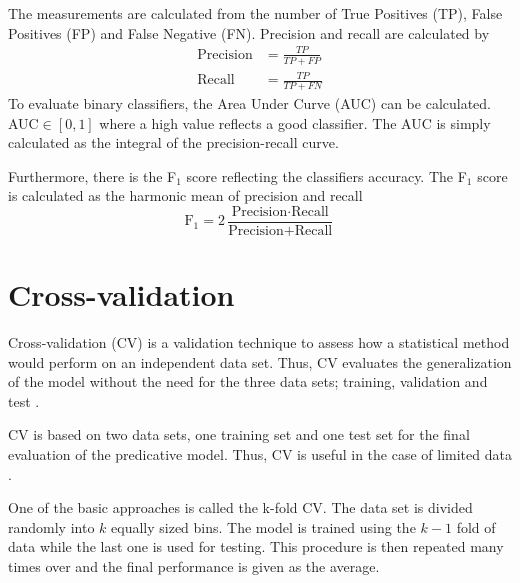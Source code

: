 The measurements are calculated from the number of True Positives (TP), False Positives (FP) and False Negative (FN). Precision and recall are calculated by \citep{powers2011}
\begin{align}
\text{Precision}&=\frac{TP}{TP+FP}\\
\text{Recall}&=\frac{TP}{TP+FN}
\end{align}
To evaluate binary classifiers, the Area Under Curve (AUC) can be calculated. AUC$\in[0,1]$ where a high value reflects a good classifier. The AUC is simply calculated as the integral of the precision-recall curve.

Furthermore, there is the F$_1$ score reflecting the classifiers accuracy. The F$_1$ score is calculated as the harmonic mean of precision and recall \citep{powers2011}
\begin{equation}
    \text{F}_1 = 2\frac{\text{Precision}\cdot \text{Recall}}{\text{Precision}+\text{Recall}}
\end{equation}

\section{Cross-validation}
Cross-validation (CV) is a validation technique to assess how a statistical method would perform on an independent data set. Thus, CV evaluates the generalization of the model without the need for the three data sets; training, validation and test \citep{Krstajic2014}.

CV is based on two data sets, one training set and one test set for the final evaluation of the predicative model. Thus, CV is useful in the case of limited data \citep{Krstajic2014}. 

One of the basic approaches is called the k-fold CV. The data set is divided randomly into $k$ equally sized bins. The model is trained using the $k-1$ fold of data while the last one is used for testing. This procedure is then repeated many times over and the final performance is given as the average.


